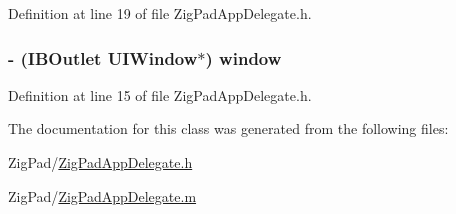 Definition at line 19 of file ZigPadAppDelegate.h.

\hypertarget{interface_zig_pad_app_delegate_a055d472434a4ee0b915c207957a400e1}{
\subsubsection[{window}]{\setlength{\rightskip}{0pt plus 5cm}-\/ (IBOutlet UIWindow$\ast$) window}}
\label{interface_zig_pad_app_delegate_a055d472434a4ee0b915c207957a400e1}


Definition at line 15 of file ZigPadAppDelegate.h.



The documentation for this class was generated from the following files:\begin{DoxyCompactItemize}
\item 
ZigPad/\hyperlink{_zig_pad_app_delegate_8h}{ZigPadAppDelegate.h}\item 
ZigPad/\hyperlink{_zig_pad_app_delegate_8m}{ZigPadAppDelegate.m}\end{DoxyCompactItemize}
